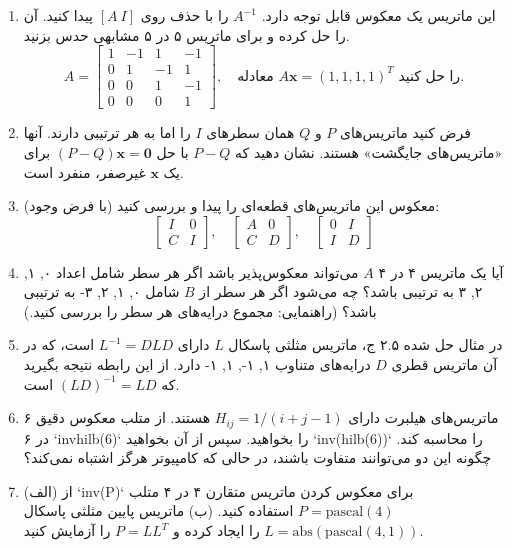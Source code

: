 \documentclass[12pt, a4paper]{book}
\begin{document}
\begin{enumerate}
		\item این ماتریس یک معکوس قابل توجه دارد. $A^{-1}$ را با حذف روی $[A \ I]$ پیدا کنید. آن را حل کرده و برای ماتریس ۵ در ۵ مشابهی حدس بزنید.
		\[ A = \begin{bmatrix} 1 & -1 & 1 & -1 \\ 0 & 1 & -1 & 1 \\ 0 & 0 & 1 & -1 \\ 0 & 0 & 0 & 1 \end{bmatrix}, \quad \text{معادله } A\mathbf{x}=(1, 1, 1, 1)^T \text{ را حل کنید.} \]
		
		\item فرض کنید ماتریس‌های $P$ و $Q$ همان سطرهای $I$ را اما به هر ترتیبی دارند. آنها «ماتریس‌های جایگشت» هستند. نشان دهید که $P-Q$ با حل $(P-Q)\mathbf{x}=\mathbf{0}$ برای یک $\mathbf{x}$ غیرصفر، منفرد است.
		
		\item معکوس این ماتریس‌های قطعه‌ای را پیدا و بررسی کنید (با فرض وجود):
		\[ \begin{bmatrix} I & 0 \\ C & I \end{bmatrix}, \quad \begin{bmatrix} A & 0 \\ C & D \end{bmatrix}, \quad \begin{bmatrix} 0 & I \\ I & D \end{bmatrix} \]
		
		\item آیا یک ماتریس ۴ در ۴ $A$ می‌تواند معکوس‌پذیر باشد اگر هر سطر شامل اعداد ۰, ۱, ۲, ۳ به ترتیبی باشد؟ چه می‌شود اگر هر سطر از $B$ شامل ۰, ۱, ۲, ۳- به ترتیبی باشد؟ (راهنمایی: مجموع درایه‌های هر سطر را بررسی کنید.)
		
		\item در مثال حل شده ۲.۵ ج، ماتریس مثلثی پاسکال $L$ دارای $L^{-1}=DLD$ است، که در آن ماتریس قطری $D$ درایه‌های متناوب ۱, ۱-, ۱, ۱- دارد. از این رابطه نتیجه بگیرید که $(LD)^{-1}=LD$ است.
		
		\item ماتریس‌های هیلبرت دارای $H_{ij} = 1/(i+j-1)$ هستند. از متلب معکوس دقیق ۶ در ۶ `invhilb(6)` را بخواهید. سپس از آن بخواهید `inv(hilb(6))` را محاسبه کند. چگونه این دو می‌توانند متفاوت باشند، در حالی که کامپیوتر هرگز اشتباه نمی‌کند؟
		
		\item (الف) از `inv(P)` برای معکوس کردن ماتریس متقارن ۴ در ۴ متلب $P=\text{pascal}(4)$ استفاده کنید.
		(ب) ماتریس پایین مثلثی پاسکال $L = \text{abs}(\text{pascal}(4,1))$ را ایجاد کرده و $P = LL^T$ را آزمایش کنید.
		

\end{enumerate}
\end{document}
